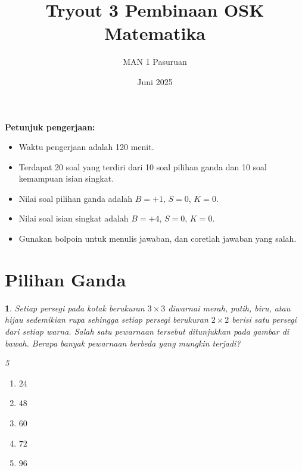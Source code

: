 \documentclass[11pt,a4paper,DIV=12]{scrartcl}
\theoremstyle{problemstyle}
\newtheorem{problem}{}
\theoremstyle{answerstyle}
\newenvironment{choices}[1][5]{%
\raggedcolumns
  \begin{multicols}{#1}%
  \begin{enumerate}[label=(\Alph*)]%
}{%
  \end{enumerate}%
  \end{multicols}%
}
\begin{document}
\title{Tryout 3 Pembinaan OSK Matematika}
\author{MAN 1 Pasuruan}
\date{Juni 2025}
\maketitle
\noindent\textbf{Petunjuk pengerjaan:}
\begin{itemize}
  \item Waktu pengerjaan adalah 120 menit.
  \item Terdapat 20 soal yang terdiri dari 10 soal pilihan ganda dan 10 soal kemampuan isian singkat.
  \item Nilai soal pilihan ganda adalah {\color{green!70!black}$B=+1$}, {\color{red}$S=0$}, $K=0$.
  \item Nilai soal isian singkat adalah {\color{green!70!black}$B=+4$}, {\color{red}$S=0$}, $K=0$.
  \item Gunakan bolpoin untuk menulis jawaban, dan coretlah jawaban yang salah.
\end{itemize}

\section*{Pilihan Ganda}
\begin{problem}
  Setiap persegi pada kotak berukuran $3 \times 3$ diwarnai merah, putih, biru, atau hijau sedemikian rupa sehingga setiap persegi berukuran $2 \times 2$ berisi satu persegi dari setiap warna. Salah satu pewarnaan tersebut ditunjukkan pada gambar di bawah. Berapa banyak pewarnaan berbeda yang mungkin terjadi?
  \begin{center}
  \end{center}

  \begin{choices}
    \item $24$
    \item $48$
    \item $60$
    \item $72$
    \item $96$
  \end{choices}
\end{problem}
\end{document}
